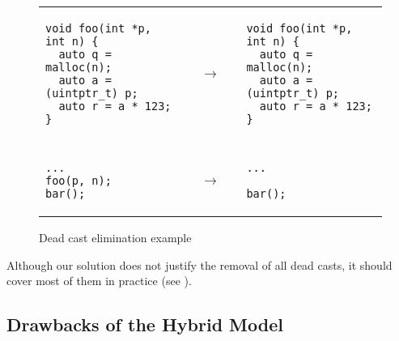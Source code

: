 \begin{figure}[t]
\small \center
\begin{tabular}{@{}l@{}l@{~~}l}
\begin{minipage}{0.4\textwidth}
\begin{verbatim}
void foo(int *p, int n) {
  auto q = malloc(n);
  auto a = (uintptr_t) p;
  auto r = a * 123;
}
\end{verbatim}
\end{minipage}
&
$\quad\rightarrow\quad$
&
\begin{minipage}{0.4\textwidth}
\begin{verbatim}
void foo(int *p, int n) {
  auto q = malloc(n);
  auto a = (uintptr_t) p;
  auto r = a * 123;
}
\end{verbatim}
\end{minipage}
\\
\\
\begin{minipage}{0.4\textwidth}
\begin{verbatim}
...
foo(p, n);
bar();
\end{verbatim}
\end{minipage}
&
$\quad\rightarrow\quad$
&
\begin{minipage}{0.4\textwidth}
\begin{verbatim}
...

bar();
\end{verbatim}
\end{minipage}
\end{tabular}
\caption{Dead cast elimination example}
\label{fig:intptrcast:formal-semantics:deadcast}
\end{figure}

Although our solution does not justify the removal of all dead casts,
it should cover most of them in practice (see ).



\subsection{Drawbacks of the Hybrid Model}
\label{sec:intptrcast:formal-semantics:drawbacks}


